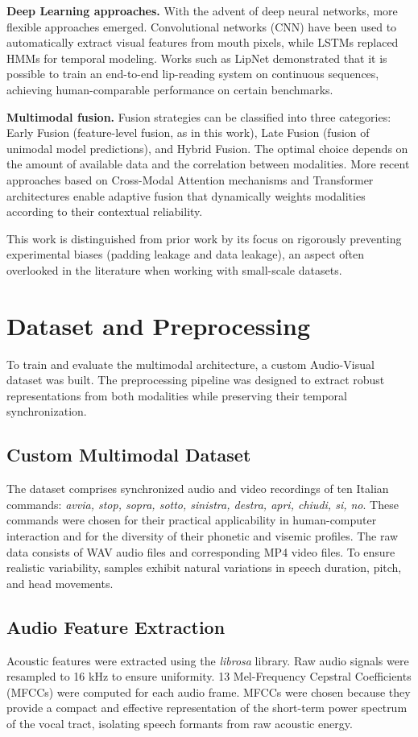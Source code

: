 \documentclass[sigconf,screen,nonacm]{acmart}
\begin{document}
\textbf{Deep Learning approaches.} With the advent of deep neural networks, more flexible approaches emerged. Convolutional networks (CNN) have been used to automatically extract visual features from mouth pixels, while LSTMs replaced HMMs for temporal modeling. Works such as LipNet \cite{assael2016lipnet} demonstrated that it is possible to train an end-to-end lip-reading system on continuous sequences, achieving human-comparable performance on certain benchmarks.

\textbf{Multimodal fusion.} Fusion strategies can be classified into three categories: Early Fusion (feature-level fusion, as in this work), Late Fusion (fusion of unimodal model predictions), and Hybrid Fusion. The optimal choice depends on the amount of available data and the correlation between modalities. More recent approaches based on Cross-Modal Attention mechanisms and Transformer architectures enable adaptive fusion that dynamically weights modalities according to their contextual reliability.

This work is distinguished from prior work by its focus on rigorously preventing experimental biases (padding leakage and data leakage), an aspect often overlooked in the literature when working with small-scale datasets.

\section{Dataset and Preprocessing}

To train and evaluate the multimodal architecture, a custom Audio-Visual dataset was built. The preprocessing pipeline was designed to extract robust representations from both modalities while preserving their temporal synchronization.

\subsection{Custom Multimodal Dataset}
The dataset comprises synchronized audio and video recordings of ten Italian commands: \textit{avvia, stop, sopra, sotto, sinistra, destra, apri, chiudi, si, no}. These commands were chosen for their practical applicability in human-computer interaction and for the diversity of their phonetic and visemic profiles. The raw data consists of WAV audio files and corresponding MP4 video files. To ensure realistic variability, samples exhibit natural variations in speech duration, pitch, and head movements.

\subsection{Audio Feature Extraction}
Acoustic features were extracted using the \textit{librosa} library. Raw audio signals were resampled to 16 kHz to ensure uniformity. 13 Mel-Frequency Cepstral Coefficients (MFCCs) were computed for each audio frame. MFCCs were chosen because they provide a compact and effective representation of the short-term power spectrum of the vocal tract, isolating speech formants from raw acoustic energy.
\end{document}
